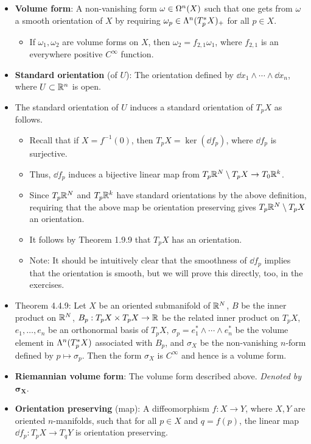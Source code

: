 \documentclass[../notes.tex]{subfiles}
\begin{document}
\begin{itemize}
\begin{itemize}
    \end{itemize}
    \item \textbf{Volume form}: A non-vanishing form $\omega\in\ome[n]{X}$ such that one gets from $\omega$ a smooth orientation of $X$ by requiring $\omega_p\in\lam[n]{T_p^*X}_+$ for all $p\in X$.
    \begin{itemize}
        \item If $\omega_1,\omega_2$ are volume forms on $X$, then $\omega_2=f_{2,1}\omega_1$, where $f_{2,1}$ is an everywhere positive $C^\infty$ function.
    \end{itemize}
    \item \textbf{Standard orientation} (of $U$): The orientation defined by $\dd{x_1}\wedge\cdots\wedge\dd{x_n}$, where $U\subset\R^n$ is open.
    \item The standard orientation of $U$ induces a standard orientation of $T_pX$ as follows.
    \begin{itemize}
        \item Recall that if $X=f^{-1}(0)$, then $T_pX=\ker(\dd{f}_p)$, where $\dd{f}_p$ is surjective.
        \item Thus, $\dd{f}_p$ induces a bijective linear map from $T_p\R^N\setminus T_pX\to T_0\R^k$.
        \item Since $T_p\R^N$ and $T_p\R^k$ have standard orientations by the above definition, requiring that the above map be orientation preserving gives $T_p\R^N\setminus T_pX$ an orientation.
        \item It follows by Theorem 1.9.9 that $T_pX$ has an orientation.
        \item Note: It should be intuitively clear that the smoothness of $\dd{f}_p$ implies that the orientation is smooth, but we will prove this directly, too, in the exercises.
    \end{itemize}
    \item Theorem 4.4.9: Let $X$ be an oriented submanifold of $\R^N$, $B$ be the inner product on $\R^N$, $B_p:T_pX\times T_pX\to\R$ be the related inner product on $T_pX$, $e_1,\dots,e_n$ be an orthonormal basis of $T_pX$, $\sigma_p=e_1^*\wedge\cdots\wedge e_n^*$ be the volume element in $\lam[n]{T_p^*X}$ associated with $B_p$, and $\sigma_X$ be the non-vanishing $n$-form defined by $p\mapsto\sigma_p$. Then the form $\sigma_X$ is $C^\infty$ and hence is a volume form.
    \item \textbf{Riemannian volume form}: The volume form described above. \emph{Denoted by} $\bm{\sigma_X}$.
    \item \textbf{Orientation preserving} (map): A diffeomorphism $f:X\to Y$, where $X,Y$ are oriented $n$-manifolds, such that for all $p\in X$ and $q=f(p)$, the linear map $\dd f_p:T_pX\to T_qY$ is orientation preserving.

\end{itemize}
\end{document}
